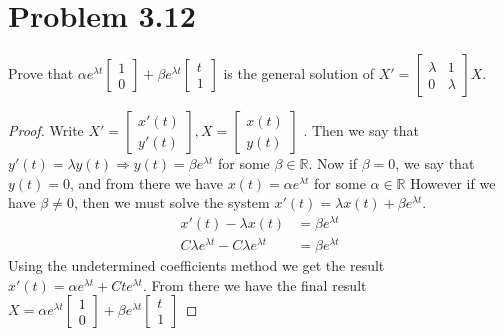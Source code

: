 \documentclass{article}
\theoremstyle{definition}
\begin{document}
\section*{Problem 3.12}
\begin{mdframed}
    Prove that $\alpha e^{\lambda t}\begin{bmatrix}
        1\\0
    \end{bmatrix} + \beta e^{\lambda t} \begin{bmatrix}
        t\\1
    \end{bmatrix}$ is the general solution of 
    $
        X' = \begin{bmatrix}
            \lambda & 1\\ 0 & \lambda
        \end{bmatrix}X
    $.
\end{mdframed}
\begin{proof}
    Write $X' = \begin{bmatrix}
        x'(t)\\y'(t)
    \end{bmatrix}, X = \begin{bmatrix}
        x(t)\\y(t)
    \end{bmatrix}$
    . Then we say that $y'(t) = \lambda y(t) \Longrightarrow y(t) = \beta e^{\lambda t}$ for some $\beta \in \mathbb{R}$.
    Now if $\beta = 0$, we say that $y(t) = 0$, and from there we have $x(t) = \alpha e^{\lambda t}$ for some $\alpha \in \mathbb{R}$
    However if we have $\beta \neq 0$, then we must solve the system $x'(t) = \lambda x(t) + \beta e^{\lambda t}$.
    \begin{align*}
        x'(t) - \lambda x(t) & = \beta e^{\lambda t}\\
        C\lambda e^{\lambda t} - C\lambda e^{\lambda t} &= \beta e^{\lambda t}
    \end{align*}
    Using the undetermined coefficients method we get the result $x'(t) = \alpha e^{\lambda t} + C t e^{\lambda t}$.
    From there we have the final result $X = \alpha e^{\lambda t}\begin{bmatrix}
        1\\0
    \end{bmatrix} + \beta e^{\lambda t} \begin{bmatrix}
        t\\1
    \end{bmatrix}$ 
\end{proof}
\end{document}

